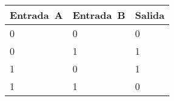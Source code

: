 
\begin{tabular}{|p{}|p{}|p{}|}
\hline
\small{Entrada\ A} & \small{Entrada\ B} & \small{Salida}\\
\hline
\small{0} & \small{0} & \small{0}\\
\hline
\small{0} & \small{1} & \small{1}\\
\hline
\small{1} & \small{0} & \small{1}\\
\hline
\small{1} & \small{1} & \small{0}\\
\hline
\end{tabular}
